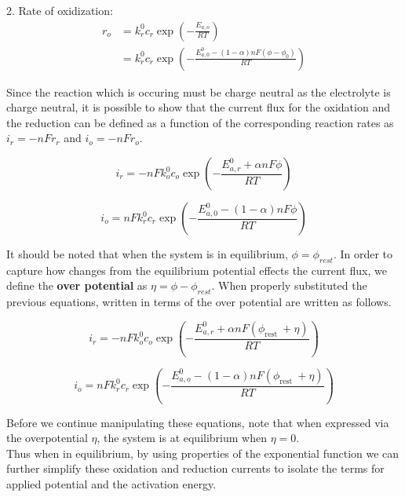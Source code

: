 \documentclass[lettersize,journal]{IEEEtran}
\begin{document}
2. Rate of oxidization:
\begin{equation}
  \begin{aligned}
  r_{o} &=k_{r}^{0} c_{r} \exp \left(-\frac{E_{a, o}}{R T}\right) \\
  &=k_{r}^{0} c_{r} \exp \left(-\frac{E_{a, 0}^{0}-(1-\alpha) n F\left(\phi-\phi_{0}\right)}{R T}\right)
  \end{aligned}
\end{equation}


\noindent Since the reaction which is occuring must be charge neutral as the electrolyte is charge neutral, it is possible to show that the current flux for the oxidation and the reduction can be defined as a function of the corresponding reaction rates as $i_r = -nFr_{r} $ and $i_o = -nFr_{o}$.

\begin{equation}
i_{r}=-n F k_{o}^{0} c_{o} \exp \left(-\frac{E_{a, r}^{0}+\alpha n F \phi}{R T}\right)
\end{equation}

\begin{equation}
i_{o}=n F k_{r}^{0} c_{r} \exp \left(-\frac{E_{a, 0}^{0}-(1-\alpha) n F \phi}{R T}\right)
\end{equation}


\noindent It should be noted that when the system is in equilibrium, $\phi = \phi_{rest}$. In order to capture how changes from the equilibrium potential effects the current flux, we define the \textbf{over potential} as $\eta = \phi - \phi_{rest}$. When properly substituted the previous equations, written in terms of the over potential are written as follows.

\begin{equation}
i_{r}=-n F k_{o}^{0} c_{o} \exp \left(-\frac{E_{a, r}^{0}+\alpha n F\left(\phi_{\text {rest }}+\eta\right)}{R T}\right)
\end{equation}

\begin{equation}
i_{o}=n F k_{r}^{0} c_{r} \exp \left(-\frac{E_{a, o}^{0}-(1-\alpha) n F\left(\phi_{\text {rest }}+\eta\right)}{R T}\right)
\end{equation}


\noindent Before we continue manipulating these equations, note that when expressed via the overpotential $\eta$, the system is at equilibrium when $\eta = 0$.  \\

\noindent Thus when in equilibrium, by using properties of the exponential function we can further simplify these oxidation and reduction currents to isolate the terms for applied potential and the activation energy.
\end{document}
